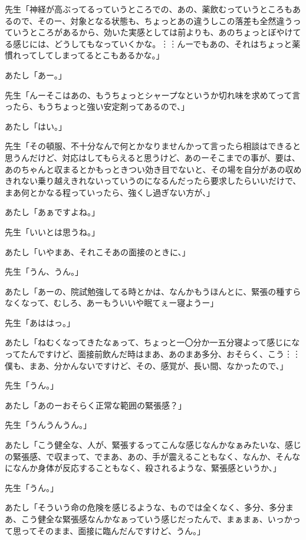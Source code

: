\documentclass[b5j,twoside,twocolumn]{utarticle}
\begin{document}
\begin{description}
\item 先生「神経が高ぶってるっていうところでの、あの、薬飲むっていうところもあるので、そのー、対象となる状態も、ちょっとあの違うしこの落差も全然違うっていうところがあるから、効いた実感としては前よりも、あのちょっとぼやけてる感じには、どうしてもなっていくかな。︙︙んーでもあの、それはちょっと薬慣れってしてしまってるとこもあるかな。」
\item あたし「あー。」
\item 先生「んーそこはあの、もうちょっとシャープなというか切れ味を求めてって言ったら、もうちょっと強い安定剤ってあるので、」
\item あたし「はい。」
\item 先生「その頓服、不十分なんで何とかなりませんかって言ったら相談はできると思うんだけど、対応はしてもらえると思うけど、あのーそこまでの事が、要は、あのちゃんと収まるとかもっときつい効き目でないと、その場を自分があの収めきれない乗り越えきれないっていうのになるんだったら要求したらいいだけで、まあ何とかなる程っていったら、強くし過ぎない方が、」
\item あたし「あぁですよね。」
\item 先生「いいとは思うね。」
\item あたし「いやまあ、それこそあの面接のときに、」
\item 先生「うん、うん。」
\item あたし「あーの、院試勉強してる時とかは、なんかもうほんとに、緊張の種すらなくなって、むしろ、あーもういいや眠てぇー寝ようー」
\item 先生「あははっ。」
\item あたし「ねむくなってきたなぁって、ちょっと一〇分か一五分寝よって感じになってたんですけど、面接前飲んだ時はまあ、あのまあ多分、おそらく、こう︙︙僕も、まあ、分かんないですけど、その、感覚が、長い間、なかったので、」
\item 先生「うん。」
\item あたし「あのーおそらく正常な範囲の緊張感？」
\item 先生「うんうんうん。」
\item あたし「こう健全な、人が、緊張するってこんな感じなんかなぁみたいな、感じの緊張感、で収まって、でまあ、あの、手が震えることもなく、なんか、そんなになんか身体が反応することもなく、殺されるような、緊張感というか、」
\item 先生「うん。」
\item あたし「そういう命の危険を感じるような、ものでは全くなく、多分、多分まあ、こう健全な緊張感なんかなぁっていう感じだったんで、まぁまぁ、いっかって思ってそのまま、面接に臨んだんですけど、うん。」

\end{description}
\end{document}
